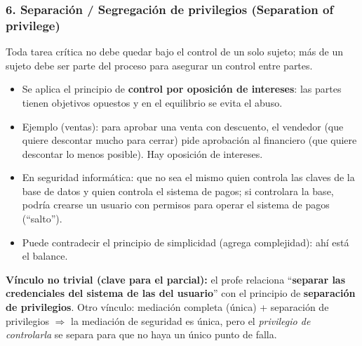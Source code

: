 \documentclass[../main.tex]{subfiles}
\begin{document}
\subsubsection{6. Separación / Segregación de privilegios (Separation of privilege)}
Toda tarea crítica no debe quedar bajo el control de un solo sujeto; más de un sujeto debe ser parte del proceso para asegurar un control entre partes.
\begin{itemize}
  \item Se aplica el principio de \textbf{control por oposición de intereses}: las partes tienen objetivos opuestos y en el equilibrio se evita el abuso.
  \item Ejemplo (ventas): para aprobar una venta con descuento, el vendedor (que quiere descontar mucho para cerrar) pide aprobación al financiero (que quiere descontar lo menos posible). Hay oposición de intereses.
  \item En seguridad informática: que no sea el mismo quien controla las claves de la base de datos y quien controla el sistema de pagos; si controlara la base, podría crearse un usuario con permisos para operar el sistema de pagos (``salto'').
  \item Puede contradecir el principio de simplicidad (agrega complejidad): ahí está el balance.
\end{itemize}

\begin{examen}
\textbf{Vínculo no trivial (clave para el parcial):} el profe relaciona ``\textbf{separar las credenciales del sistema de las del usuario}'' con el principio de \textbf{separación de privilegios}. Otro vínculo: mediación completa (única) + separación de privilegios $\Rightarrow$ la mediación de seguridad es única, pero el \emph{privilegio de controlarla} se separa para que no haya un único punto de falla.
\end{examen}
\end{document}
